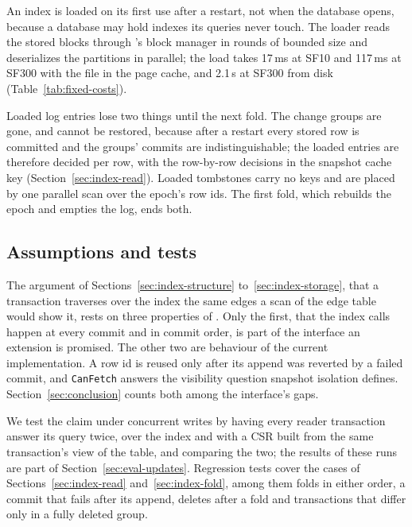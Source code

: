 An index is loaded on its first use after a restart, not when the database opens, because a database may hold
indexes its queries never touch. The loader reads the stored blocks through \duckdb's block manager in rounds of
bounded size and deserializes the partitions in parallel; the load takes 17\,ms at SF10 and 117\,ms at SF300 with the file in the page cache, and 2.1\,s at SF300 from disk (Table~\ref{tab:fixed-costs}).

Loaded log entries lose two things until the next fold. The change groups are gone, and cannot be restored, because
after a restart every stored row is committed and the groups' commits are indistinguishable; the loaded entries are
therefore decided per row, with the row-by-row decisions in the snapshot cache key (Section~\ref{sec:index-read}).
Loaded tombstones carry no keys and are placed by one parallel scan over the epoch's row ids. The first fold, which
rebuilds the epoch and empties the log, ends both.

\subsection{Assumptions and tests}
\label{sec:index-correctness}

The argument of Sections~\ref{sec:index-structure} to~\ref{sec:index-storage}, that a transaction traverses over
the index the same edges a scan of the edge table would show it, rests on three properties of \duckdb. Only the first, that
the index calls happen at every commit and in commit order, is part of the interface an extension is promised. The other
two are behaviour of the current implementation. A row id is reused only after its append was reverted by a failed
commit, and \texttt{CanFetch} answers the visibility question snapshot isolation defines. Section~\ref{sec:conclusion} counts both among the interface's gaps.

We test the claim under concurrent writes by having every reader transaction answer its query twice, over the
index and with a CSR built from the same transaction's view of the table, and comparing the two; the results of these
runs are part of Section~\ref{sec:eval-updates}. Regression tests cover the cases of Sections~\ref{sec:index-read}
and~\ref{sec:index-fold}, among them folds in either order, a commit that fails after its append, deletes after a fold
and transactions that differ only in a fully deleted group.


